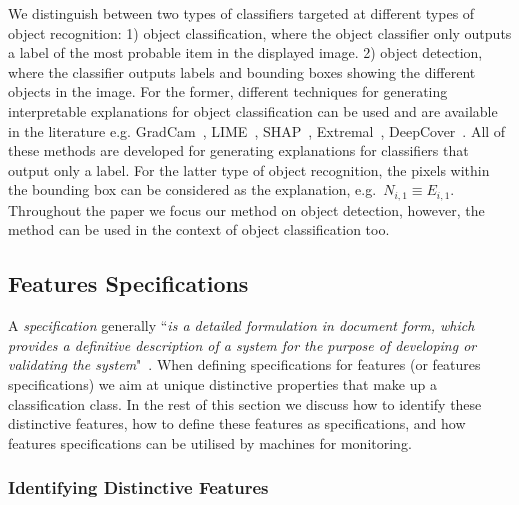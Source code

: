 We distinguish between two types of classifiers targeted at different types of object recognition: 1) object classification, where the object classifier only outputs a label of the most probable item in the displayed image. 2) object detection, where the classifier outputs labels and bounding boxes showing the different objects in the image.
%
For the former, different techniques for generating interpretable explanations for object classification can be used and are available in the literature e.g. GradCam~\cite{Selvaraju2020}, LIME~\cite{Ribeiro2016}, SHAP~\cite{Lundberg2017}, Extremal~\cite{Fong2019}, DeepCover~\cite{Sun2020}. 
%
All of these methods are developed for generating explanations for classifiers that output only a label. %
%
For the latter type of object recognition, the pixels within the bounding box can be considered as the explanation, e.g.\ $N_{i,1}\equiv E_{i,1}$.
%
%
Throughout the paper we focus our method on object detection, however, the method can be used in the context of object classification too. 

 
\subsection{Features Specifications}
A \textit{specification} generally ``\textit{is a detailed formulation in document form, which provides a definitive description of a system for the purpose of developing or validating the system}"~\cite{ISO24765}\cite{Dhaminda2022a}. 
%
When defining specifications for features (or features specifications) we aim at unique distinctive properties that make up a classification class. In the rest of this section we discuss how to identify these distinctive features, how to define these features as specifications, and how features specifications can be utilised by machines for monitoring.  

\subsubsection{Identifying Distinctive Features}
 
